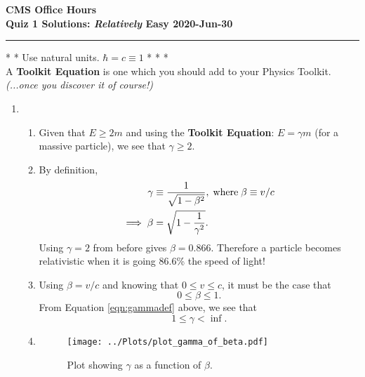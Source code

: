 \documentclass[11pt]{article}
\begin{document}
\Large
\noindent\textbf{CMS Office Hours} \\
\noindent\textbf{Quiz 1 Solutions: \emph{Relatively} Easy \hfill 2020-Jun-30}
\medskip\hrule
\vspace{2mm}
\centering * * * Use natural units. $\hbar = c \equiv 1$ * * * \\
\centering A \textbf{Toolkit Equation} is one which you should 
add to your Physics Toolkit. \\
\textit{(...once you discover it of course!)}
\begin{enumerate}
\item 
    \begin{enumerate}
    \item Given that $E \geq 2m$ and using the \textbf{Toolkit Equation}: 
    $E = \gamma m$ (for a massive particle), we see that $\gamma \geq 2$.
    
    \item By definition,
    \begin{align}
        \gamma &\equiv \frac{1}{\sqrt{1 - \beta ^2}} \label{eqn:gammadef}
        , \;{\rm where\;} \beta \equiv v/c \\
        \implies \beta &= \sqrt{1 - \frac{1}{\gamma^2}}. \nonumber 
    \end{align}
    Using $\gamma = 2$ from before gives $\beta = 0.866$. 
    Therefore a particle becomes relativistic when it is going 86.6\% the speed of light! 

    \item Using $\beta = v/c$ and knowing that $0 \leq v \leq c$, it must be the case that 
    $$0 \leq \beta \leq 1.$$
    From Equation \ref{eqn:gammadef} above, we see that $$1 \leq \gamma < \inf .$$

    \item
    \begin{figure}[b]
    \centering
    \texttt{[image: ../Plots/plot\_gamma\_of\_beta.pdf]}
        \caption{Plot showing $\gamma$ as a function of $\beta$.} 
    \end{figure}

    \end{enumerate}
    
\pagebreak


\end{enumerate}
\end{document}
